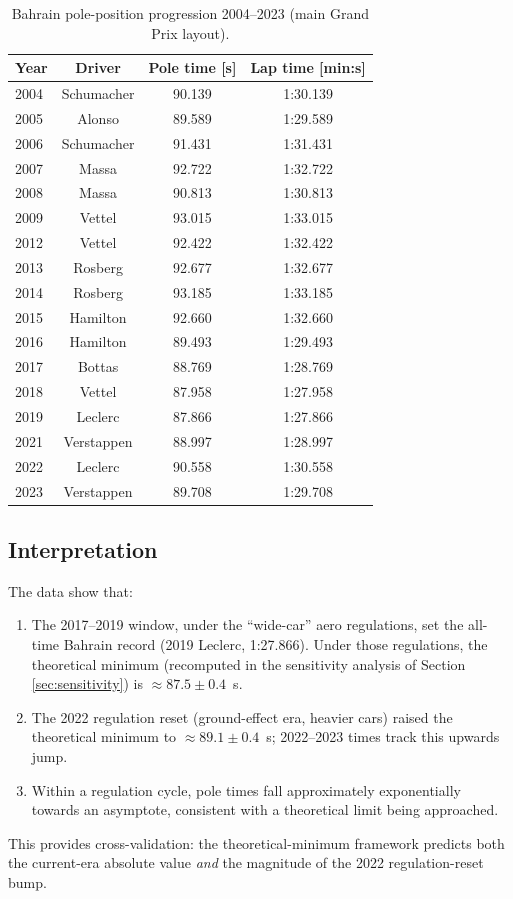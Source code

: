 \documentclass[11pt,twocolumn]{article}
\theoremstyle{definition}
\theoremstyle{remark}
\begin{document}
\begin{table}[!t]
\centering
\caption{Bahrain pole-position progression 2004--2023 (main Grand Prix layout).}
\label{tab:history}
\begin{tabular}{lccc}
\toprule
Year & Driver & Pole time [s] & Lap time [min:s] \\
\midrule
2004 & Schumacher  & 90.139 & 1:30.139\\
2005 & Alonso      & 89.589 & 1:29.589\\
2006 & Schumacher  & 91.431 & 1:31.431\\
2007 & Massa       & 92.722 & 1:32.722\\
2008 & Massa       & 90.813 & 1:30.813\\
2009 & Vettel      & 93.015 & 1:33.015\\
2012 & Vettel      & 92.422 & 1:32.422\\
2013 & Rosberg     & 92.677 & 1:32.677\\
2014 & Rosberg     & 93.185 & 1:33.185\\
2015 & Hamilton    & 92.660 & 1:32.660\\
2016 & Hamilton    & 89.493 & 1:29.493\\
2017 & Bottas      & 88.769 & 1:28.769\\
2018 & Vettel      & 87.958 & 1:27.958\\
2019 & Leclerc     & 87.866 & 1:27.866\\
2021 & Verstappen  & 88.997 & 1:28.997\\
2022 & Leclerc     & 90.558 & 1:30.558\\
2023 & Verstappen  & 89.708 & 1:29.708\\
\bottomrule
\end{tabular}
\end{table}

\subsection{Interpretation}

The data show that:
\begin{enumerate}
  \item The 2017--2019 window, under the ``wide-car'' aero regulations, set
        the all-time Bahrain record (2019 Leclerc, 1:27.866). Under those
        regulations, the theoretical minimum (recomputed in the
        sensitivity analysis of Section \ref{sec:sensitivity}) is
        $\approx 87.5 \pm 0.4$~s.
  \item The 2022 regulation reset (ground-effect era, heavier cars) raised
        the theoretical minimum to $\approx 89.1 \pm 0.4$~s; 2022--2023
        times track this upwards jump.
  \item Within a regulation cycle, pole times fall approximately
        exponentially towards an asymptote, consistent with a theoretical
        limit being approached.
\end{enumerate}
This provides cross-validation: the theoretical-minimum framework predicts
both the current-era absolute value \emph{and} the magnitude of the
2022 regulation-reset bump.
\end{document}
